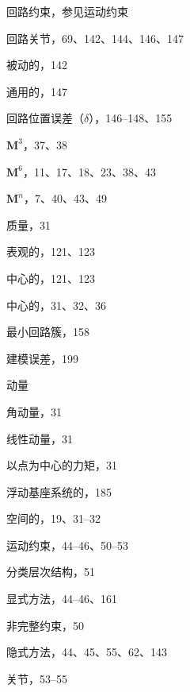 \documentclass[10pt,a4paper]{book}
\theoremstyle{thmstyle} %
\theoremstyle{defstyle} %
\theoremstyle{prostyle} %
\begin{document}
回路约束，参见运动约束



回路关节，69、142、144、146、147



被动的，142



通用的，147



回路位置误差（$\delta$），146–148、155



$\mathbf{M}^{3}$，37、38



$\mathbf{M}^{6}$，11、17、18、23、38、43



$\mathbf{M}^{n}$，7、40、43、49



质量，31



表观的，121、123



中心的，121、123



中心的，31、32、36



最小回路簇，158



建模误差，199



动量



角动量，31



线性动量，31



以点为中心的力矩，31



浮动基座系统的，185



空间的，19、31–32



运动约束，44–46、50–53



分类层次结构，51



显式方法，44–46、161



非完整约束，50



隐式方法，44、45、55、62、143



关节，53–55
\end{document}
